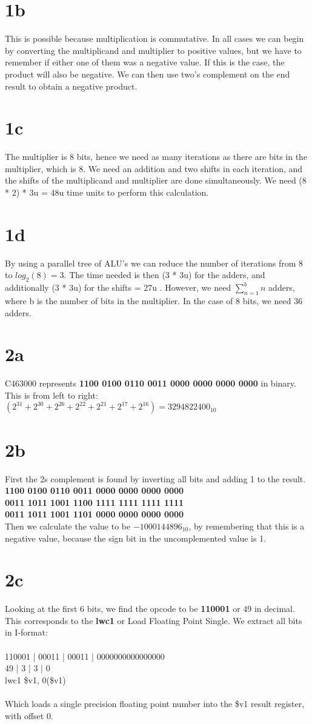 \documentclass[10pt,a4paper]{article}
\begin{document}
	\section*{1b}
	This is possible because multiplication is commutative. In all cases we can begin by converting the multiplicand and multiplier to positive values, but we have to remember if either one of them was a negative value. If this is the case, the product will also be negative. We can then use two's complement on the end result to
	obtain a negative product.
	\section*{1c}
	The multiplier is 8 bits, hence we need as many iterations as there are bits in the multiplier, which is 8. We need an addition and two shifts in each iteration, and the shifts of the multiplicand and multiplier are done simultaneously. We need (8 * 2) * 3u  = 48u time units to perform this calculation.
	\section*{1d}
	By using a parallel tree of ALU's we can reduce the number of iterations from 8 to $log_{2}(8) = 3$. The time needed is then (3 *  3u) for the adders, and additionally (3 * 3u) for the shifts = 27u . However, we need $\sum_{n=1}^{b} n$ adders, where b is the number of bits in the multiplier. In the case of 8 bits, we need 36 adders.
	\section*{2a}
	C463000 represents \textbf{1100 0100 0110 0011 0000 0000 0000 0000} in binary. This is from left to right: $(2^{31} + 2^{30} + 2^{26} + 2^{22} + 2^{21} + 2^{17} + 2^{16}) = 3294822400_{10}$
	\section*{2b}
	First the 2s complement is found by inverting all bits and adding 1 to the result.
	\textbf{1100 0100 0110 0011 0000 0000 0000 0000} \\
	\textbf{0011 1011 1001 1100 1111 1111 1111 1111} \\
	\textbf{0011 1011 1001 1101 0000 0000 0000 0000} \\
	Then we calculate the value to be $-1000144896_{10}$, by remembering that this is a negative value, because the sign bit in the uncomplemented value is 1.
	\section*{2c}
 Looking at the first 6 bits, we find the opcode to be \textbf{110001} or 49 in decimal. This corresponds to the \textbf{lwc1} or Load Floating Point Single. We extract all bits in I-format: \\\\
	110001 | 00011 | 00011 | 0000000000000000 \\
	49 | 3 | 3 | 0 \\
	lwc1 \$v1, 0(\$v1) \\\\
	Which loads a single precision floating point number into the \$v1 result register, with offset 0.  
\end{document}
